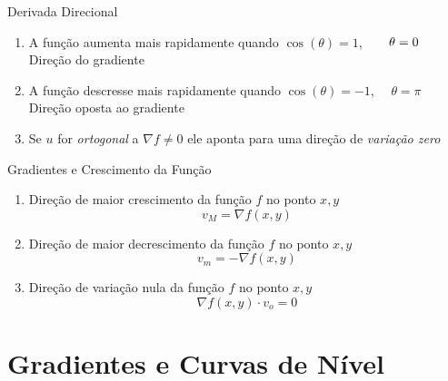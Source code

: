 \documentclass[fleqn,utf8,aspectratio=169,12pt,ignorenonframetext]{beamer}
\begin{document}
\begin{frame}{Derivada Direcional}
\begin{enumerate}
  \setlength\itemsep{1.5em}
  \item A função aumenta mais rapidamente quando
        \pause
        \tabto{82mm}\emph{$\cos(\theta)=1$},
        \pause
        \emph{$\hphantom{-}\quad\theta=0$} \\[2mm]
        \pause
        Direção do gradiente
        \pause
  \item A função descresse mais rapidamente quando
        \pause
        \tabto{82mm}\emph{$\cos(\theta)=-1$},
        \pause
        \emph{$\quad\theta=\pi$} \\[2mm]
        \pause
        Direção oposta ao gradiente
        \pause
  \item Se $u$ for \emph{ortogonal} a \(\nabla f\neq 0\)
        \pause
        ele aponta para uma direção de \emph{variação zero}
\end{enumerate}
\end{frame}

\begin{frame}{Gradientes e Crescimento da Função}
  \begin{enumerate}[<+->]
    \setlength\itemsep{1.5em}
    \item Direção de maior crescimento da função $f$ no ponto \({x, y}\)
          \[
            v_M = \nabla f(x, y)
          \]
    \item Direção de maior decrescimento da função $f$ no ponto \({x, y}\)
          \[
            v_m = -\nabla f(x, y)
          \]
    \item Direção de variação nula da função $f$ no ponto \({x, y}\)
          \[
            \nabla f(x, y) \cdot v_o  = 0
          \]
  \end{enumerate}
\end{frame}



\section{Gradientes e Curvas de Nível}
\end{document}
